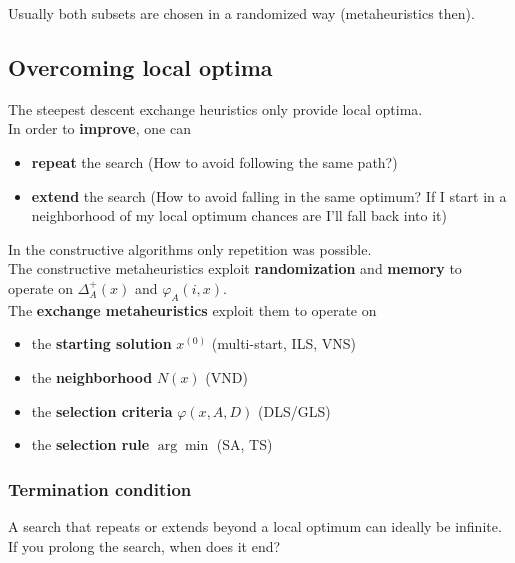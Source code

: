 \documentclass[11pt]{article}
\begin{document}
	Usually both subsets are chosen in a randomized way (metaheuristics then). \\
	
	
	\newpage
	
	\subsection{Overcoming local optima}
	The steepest descent exchange heuristics only provide local optima.\\
	
	In order to \textbf{improve}, one can
	\begin{itemize}
		\item \textbf{repeat} the search (How to avoid following the same path?)
		\item \textbf{extend} the search (How to avoid falling in the same optimum? If I start in a neighborhood of my local optimum chances are I'll fall back into it)
	\end{itemize}
	
	In the constructive algorithms only repetition was possible.\\
	
	The constructive metaheuristics exploit \textbf{randomization} and \textbf{memory} to operate on $\Delta_A^+ (x)$ and $\varphi_A (i, x)$.\\
	
	The \textbf{exchange metaheuristics} exploit them to operate on
	\begin{itemize}
		\item the \textbf{starting solution} $x^{(0)}$ (multi-start, ILS, VNS)
		\item the \textbf{neighborhood} $N (x)$ (VND)
		\item the \textbf{selection criteria} $\varphi (x, A, D)$ (DLS/GLS)
		\item the \textbf{selection rule} $\arg \min$ (SA, TS)
	\end{itemize}
	
	\newpage
	
	\subsubsection{Termination condition} 
	
	A search that repeats or extends beyond a local optimum can ideally be infinite. If you prolong the search, when does it end? \\
	
\end{document}
